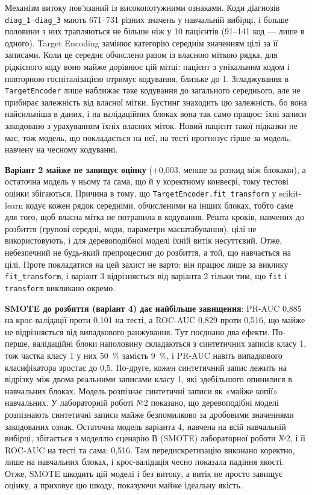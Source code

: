 \documentclass[14pt,a4paper]{extreport}
\begin{document}
Механізм витоку пов'язаний із високопотужними ознаками. Коди діагнозів \texttt{diag\_1}--\texttt{diag\_3} мають 671--731 різних значень у навчальній вибірці, і більше половини з них трапляються не більше ніж у 10 пацієнтів (91--141 код --- лише в одного). Target Encoding замінює категорію середнім значенням цілі за її записами. Коли це середнє обчислено разом із власною міткою рядка, для рідкісного коду воно майже дорівнює цій мітці: пацієнт з унікальним кодом і повторною госпіталізацією отримує кодування, близьке до 1. Згладжування в \texttt{TargetEncoder} лише наближає таке кодування до загального середнього, але не прибирає залежність від власної мітки. Бустинг знаходить цю залежність, бо вона найсильніша в даних, і на валідаційних блоках вона так само працює: їхні записи закодовано з урахуванням їхніх власних міток. Новий пацієнт такої підказки не має, тож модель, що покладається на неї, на тесті прогнозує гірше за модель, навчену на чесному кодуванні.

\textbf{Варіант 2 майже не завищує оцінку} (+0,003, менше за розкид між блоками), а остаточна модель у ньому та сама, що й у коректному конвеєрі, тому тестові оцінки збігаються. Причина в тому, що \texttt{TargetEncoder.fit\_transform} у scikit-learn кодує кожен рядок середніми, обчисленими на інших блоках, тобто саме для того, щоб власна мітка не потрапила в кодування. Решта кроків, навчених до розбиття (групові середні, моди, параметри масштабування), цілі не використовують, і для деревоподібної моделі їхній витік несуттєвий. Отже, небезпечний не будь-який препроцесинг до розбиття, а той, що навчається на цілі. Проте покладатися на цей захист не варто: він працює лише за виклику \texttt{fit\_transform}, і варіант 3 відрізняється від варіанта 2 тільки тим, що \texttt{fit} і \texttt{transform} викликано окремо.

\textbf{SMOTE до розбиття (варіант 4) дає найбільше завищення}: PR-AUC 0,885 на крос-валідації проти 0,101 на тесті, а ROC-AUC 0,829 проти 0,516, що майже не відрізняється від випадкового ранжування. Тут поєднано два ефекти. По-перше, валідаційні блоки наполовину складаються з синтетичних записів класу 1, тож частка класу 1 у них 50~\% замість 9~\%, і PR-AUC навіть випадкового класифікатора зростає до 0,5. По-друге, кожен синтетичний запис лежить на відрізку між двома реальними записами класу 1, які здебільшого опинилися в навчальних блоках. Модель розпізнає синтетичні записи як «майже копії» навчальних. У лабораторній роботі №2 показано, що деревоподібні моделі розпізнають синтетичні записи майже безпомилково за дробовими значеннями закодованих ознак. Остаточна модель варіанта 4, навчена на всій навчальній вибірці, збігається з моделлю сценарію В (SMOTE) лабораторної роботи №2, і її ROC-AUC на тесті та сама: 0,516. Там передискретизацію виконано коректно, лише на навчальних блоках, і крос-валідація чесно показала падіння якості. Отже, SMOTE шкодить цій моделі і без витоку, а витік не просто завищує оцінку, а приховує цю шкоду, показуючи майже ідеальну якість.
\end{document}
